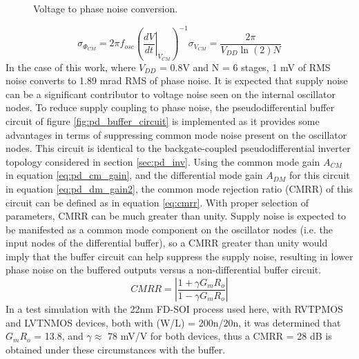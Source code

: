 			\begin{figure}[htb!]
			        \centering
			        
			    \caption{Voltage to phase noise conversion.}
			    \label{fig:voltn_to_pn}
			\end{figure}
			\begin{equation}\label{eq:vnoise_to_pnoise}
					\sigma_{\Phi_{CM}} = 2\pi f_{osc}\left(\left.\frac{dV}{dt}\right|_{V_{CM}}\right)^{-1}\sigma_{V_{CM}} = \frac{2\pi}{V_{DD}\ln(2)N} 
			\end{equation}
		In the case of this work, where $V_{DD}$ = 0.8V and N = 6 stages, 1 mV of RMS noise converts to 1.89 mrad RMS of phase noise. It is expected that supply noise can be a significant contributor to voltage noise seen on the internal oscillator nodes. To reduce supply coupling to phase noise, the pseudodifferential buffer circuit of figure \ref{fig:pd_buffer_circuit} is implemented as it provides some advantages in terms of suppressing common mode noise present on the oscillator nodes. This circuit is identical to the backgate-coupled pseudodifferential inverter topology considered in section \ref{sec:pd_inv}. Using the common mode gain $A_{CM}$ in equation \ref{eq:pd_cm_gain}, and the differential mode gain $A_{DM}$ for this circuit in equation \ref{eq:pd_dm_gain2}, the common mode rejection ratio (CMRR) of this circuit can be defined as in equation \ref{eq:cmrr}. With proper selection of parameters, CMRR can be much greater than unity. Supply noise is expected to be manifested as a common mode component on the oscillator nodes (i.e. the input nodes of the differential buffer), so a CMRR greater than unity would imply that the buffer circuit can help suppress the supply noise, resulting in lower phase noise on the buffered outputs versus a non-differential buffer circuit.
				\begin{equation}\label{eq:cmrr}
					CMRR = \left|\frac{1+\gamma G_m R_o}{1-\gamma G_m R_o}\right|
				\end{equation}
		In a test simulation with the 22nm FD-SOI process used here, with RVTPMOS and LVTNMOS devices, both with (W/L) = 200n/20n, it was determined that $G_m R_o$ = 13.8, and $\gamma\approx$ 78 mV/V for both devices, thus a CMRR = 28 dB is obtained under these circumstances with the buffer. 

		

